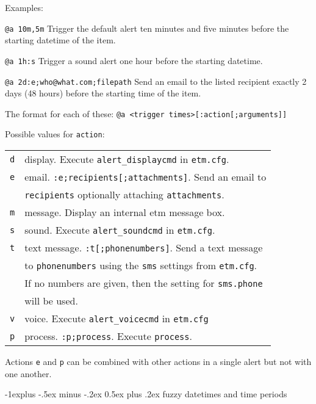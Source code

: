 \documentclass[9pt,landscape]{article}
\makeatletter
\renewcommand{\subsection}{\@startsection{subsection}{2}{0mm}%
                                {-1explus -.5ex minus -.2ex}%
                                {0.5ex plus .2ex}%
                                {\normalfont\normalsize\bfseries}}
\makeatother
\begin{document}
\begin{multicols}{3}
Examples:
\begin{compactdesc}
  \item[\texttt{@a 10m,5m}] Trigger the default alert ten minutes and five minutes before the starting datetime of the item.
  \item[\texttt{@a 1h:s}] Trigger a sound alert one hour before the starting datetime.
  \item[\texttt{@a 2d:e;who@what.com;filepath}] Send an email to the listed recipient exactly 2 days (48 hours) before the starting time of the item.
\end{compactdesc}

The format for each of these:
\vskip 3pt
\texttt{@a <trigger times>[:action[;arguments]]}
\vskip 3pt

Possible values for \verb!action!:
\vskip 3pt

\begin{tabular}{@{}ll@{}}
\texttt{d} & display. Execute \verb!alert_displaycmd! in \verb!etm.cfg!. \\
\texttt{e} & email. \verb!:e;recipients[;attachments]!. Send an email to \\
           & \verb!recipients! optionally attaching \verb!attachments!.\\
\texttt{m} & message. Display an internal etm message box. \\
\texttt{s} & sound. Execute \verb!alert_soundcmd! in \verb!etm.cfg!. \\
\texttt{t} & text message. \verb!:t[;phonenumbers]!. Send a text message \\
           & to \verb'phonenumbers' using the \verb'sms' settings from \verb'etm.cfg'. \\
           & If no numbers are given, then the setting for \verb'sms.phone' \\
           & will be used. \\
\texttt{v} & voice. Execute \verb!alert_voicecmd! in \verb!etm.cfg! \\
\texttt{p} & process. \verb!:p;process!. Execute \verb!process!.  \\
\end{tabular}

\vskip 3pt

Actions \verb!e! and \verb!p! can be combined with other actions in a single alert but not with one another.


\subsection{fuzzy datetimes and time periods}


\end{multicols}
\end{document}

